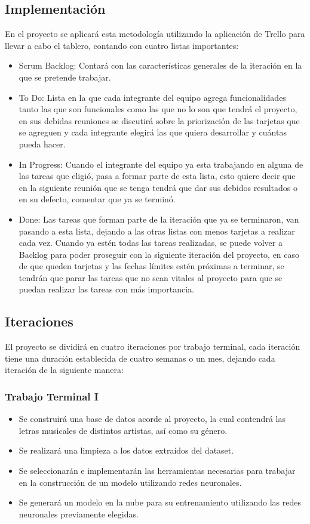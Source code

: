 \documentclass[12pt, a4paper, titlepage]{report}
\begin{document}
    	\subsection{Implementación}
    	En el proyecto se aplicará esta metodología utilizando la aplicación de Trello para llevar a cabo el tablero, contando con cuatro listas importantes:
    	\begin{itemize}
    		\item Scrum Backlog: Contará con las características generales de la iteración en la que se pretende trabajar.
    		\item To Do: Lista en la que cada integrante del equipo agrega funcionalidades tanto las que son funcionales como las que no lo son que tendrá el proyecto, en sus debidas reuniones se discutirá sobre la priorización de las tarjetas que se agreguen y cada integrante elegirá las que quiera desarrollar y cuántas pueda hacer.
    		\item In Progress: Cuando el integrante del equipo ya esta trabajando en alguna de las tareas que eligió, pasa a formar parte de esta lista, esto quiere decir que en la siguiente reunión que se tenga tendrá que dar sus debidos resultados o en su defecto, comentar que ya se terminó.
    		\item Done: Las tareas que forman parte de la iteración que ya se terminaron, van pasando a esta lista, dejando a las otras listas con menos tarjetas a realizar cada vez. Cuando ya estén todas las tareas realizadas, se puede volver a Backlog para poder proseguir con la siguiente iteración del proyecto, en caso de que queden tarjetas y las fechas límites estén próximas a terminar, se tendrán que parar las tareas que no sean vitales al proyecto para que se puedan realizar las tareas con más importancia.
    	\end{itemize} 
    	\subsection{Iteraciones}
    	El proyecto se dividirá en cuatro iteraciones por trabajo terminal, cada iteración tiene una duración establecida de cuatro semanas o un mes, dejando cada iteración de la siguiente manera:
    	\subsubsection*{Trabajo Terminal I}
    	\begin{itemize}
    		\item Se construirá una base de datos acorde al proyecto, la cual contendrá las letras musicales de distintos artistas, así como su género.
    		\item Se realizará una limpieza a los datos extraídos del dataset.
    		\item Se seleccionarán e implementarán las herramientas necesarias para trabajar en la construcción de un modelo utilizando redes neuronales.
    		\item Se generará un modelo en la nube para su entrenamiento utilizando las redes neuronales previamente elegidas.
    	\end{itemize}
\end{document}
